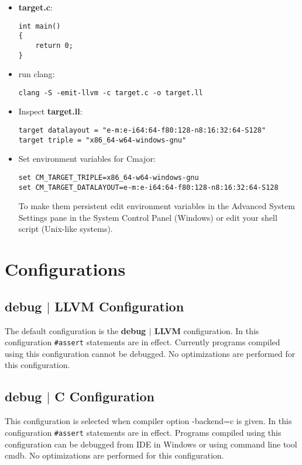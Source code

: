 \documentclass[oneside, a4paper, 11pt]{article}
\begin{document}
\begin{itemize}
\item \textbf{target.c}:
\begin{verbatim}
int main()
{
    return 0;
}
\end{verbatim}

\item run clang:
\begin{verbatim}
clang -S -emit-llvm -c target.c -o target.ll
\end{verbatim}

\item Inspect \textbf{target.ll}:
\begin{verbatim}
target datalayout = "e-m:e-i64:64-f80:128-n8:16:32:64-S128"
target triple = "x86_64-w64-windows-gnu"
\end{verbatim}

\item Set environment variables for Cmajor:
\begin{verbatim}
set CM_TARGET_TRIPLE=x86_64-w64-windows-gnu
set CM_TARGET_DATALAYOUT=e-m:e-i64:64-f80:128-n8:16:32:64-S128
\end{verbatim}

To make them persistent edit environment variables in the Advanced System Settings pane in the System Control Panel (Windows) or
edit your shell script (Unix-like systems).

\end{itemize}

\section{Configurations}

\subsection{debug $|$ LLVM Configuration}

The default configuration is the \textbf{debug $|$ LLVM} configuration. In this configuration \verb|#assert| statements are in effect.
Currently programs compiled using this configuration cannot be debugged. No optimizations are performed for this configuration.

\subsection{debug $|$ C Configuration}

This configuration is selected when compiler option -backend=c is given. In this configuration \verb|#assert| statements are in effect.
Programs compiled using this configuration can be debugged from IDE in Windows or using command line tool cmdb.
No optimizations are performed for this configuration.
\end{document}

